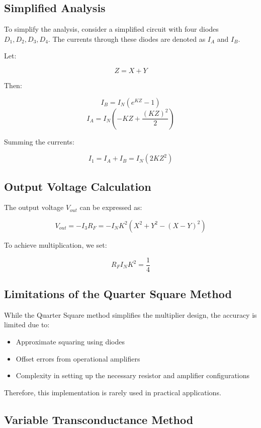 \documentclass[a4paper,9pt,twoside,openany,twocolumn]{memoir}
\begin{document}
\subsection{Simplified Analysis}

To simplify the analysis, consider a simplified circuit with four diodes \( D_1, D_2, D_3, D_4 \). The currents through these diodes are denoted as \( I_A \) and \( I_B \).

Let:

\[
Z = X + Y
\]

Then:

\[
I_B = I_{N} \left(e^{KZ} - 1\right)
\]
\[
I_A = I_{N} \left(-KZ + \frac{(KZ)^2}{2}\right)
\]

Summing the currents:

\[
I_1 = I_A + I_B = I_{N} \left(2KZ^2\right)
\]

\subsection{Output Voltage Calculation}

The output voltage \( V_{out} \) can be expressed as:

\[
V_{out} = -I_3 R_F = -I_{N} K^2 (X^2 + Y^2 - (X - Y)^2)
\]

To achieve multiplication, we set:

\[
R_F I_{N} K^2 = \frac{1}{4}
\]

\subsection{Limitations of the Quarter Square Method}

While the Quarter Square method simplifies the multiplier design, the accuracy is limited due to:

\begin{itemize}
    \item Approximate squaring using diodes
    \item Offset errors from operational amplifiers
    \item Complexity in setting up the necessary resistor and amplifier configurations
\end{itemize}

Therefore, this implementation is rarely used in practical applications.

\subsection{Variable Transconductance Method}
\end{document}
